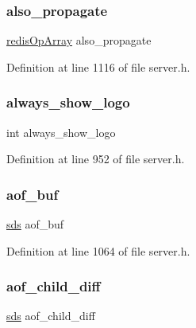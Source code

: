 \subsubsection{\texorpdfstring{also\+\_\+propagate}{also\_propagate}}
{\footnotesize\ttfamily \hyperlink{structredis_op_array}{redis\+Op\+Array} also\+\_\+propagate}



Definition at line 1116 of file server.\+h.

\mbox{\label{structredis_server_a7dff68985c6f97d270358d27472972e2}} 
\subsubsection{\texorpdfstring{always\+\_\+show\+\_\+logo}{always\_show\_logo}}
{\footnotesize\ttfamily int always\+\_\+show\+\_\+logo}



Definition at line 952 of file server.\+h.

\mbox{\label{structredis_server_a4546e03b0256d4d50b71681b6cd45f52}} 
\subsubsection{\texorpdfstring{aof\+\_\+buf}{aof\_buf}}
{\footnotesize\ttfamily \hyperlink{sds_8h_ad69abac3df4532879db9642c95f5ef6f}{sds} aof\+\_\+buf}



Definition at line 1064 of file server.\+h.

\mbox{\label{structredis_server_a271e57a2ee7bec8acce8060704c268e3}} 
\subsubsection{\texorpdfstring{aof\+\_\+child\+\_\+diff}{aof\_child\_diff}}
{\footnotesize\ttfamily \hyperlink{sds_8h_ad69abac3df4532879db9642c95f5ef6f}{sds} aof\+\_\+child\+\_\+diff}



